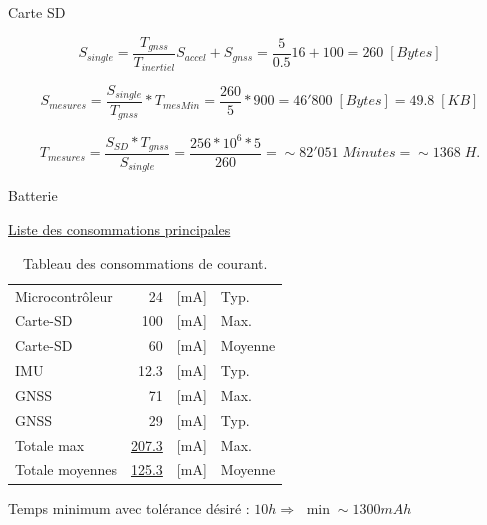 \documentclass{beamer}
\begin{document}
\begin{frame}{Carte SD}
	\begin{center}
	\end{center}\vspace*{-3mm}
	
	\begin{equation*}
		S_{single} = \frac{T_{gnss}}{T_{inertiel}}S_{accel} + S_{gnss} = \frac{5}{0.5}16 + 100 = 260 \; [Bytes]
	\end{equation*}\vspace*{-10mm}
	
	\begin{equation*}
		S_{mesures} = \frac{S_{single}}{T_{gnss}} * T_{mesMin} = \frac{260}{5} * 900 = 46'800 \; [Bytes] = 49.8 \; [KB]
	\end{equation*}\vspace*{-10mm}
	
	\begin{equation*}
		T_{mesures} = \frac{S_{SD}*T_{gnss}}{S_{single}} = \frac{256*10^6*5}{260} = \sim82'051 \; Minutes = \sim1368 \; H.
	\end{equation*}
\end{frame}

\begin{frame}{Batterie}
	\begin{center}
		\underline{Liste des consommations principales} \\
		\begin{table}[h]
			\centering
			\begin{tabular}{lrll}
				Microcontrôleur & 24 & [mA] & Typ. \\
				Carte-SD & ~100 & [mA] & Max. \\
				Carte-SD & ~60 & [mA] & Moyenne \\
				IMU & 12.3 & [mA] & Typ. \\
				GNSS & 71 & [mA] & Max. \\
				GNSS & 29 & [mA] & Typ. \\
				\hline
				Totale max & \underline{207.3} & [mA] & Max. \\
				Totale moyennes & \underline{125.3} & [mA] & Moyenne \\
				\hline
			\end{tabular}
			\caption{Tableau des consommations de courant.}
			\label{tab:consommateur}
		\end{table}
	\end{center}
	Temps minimum avec tolérance désiré : $10h \Rightarrow$ $\min\sim1300mAh$
\end{frame}
\end{document}
